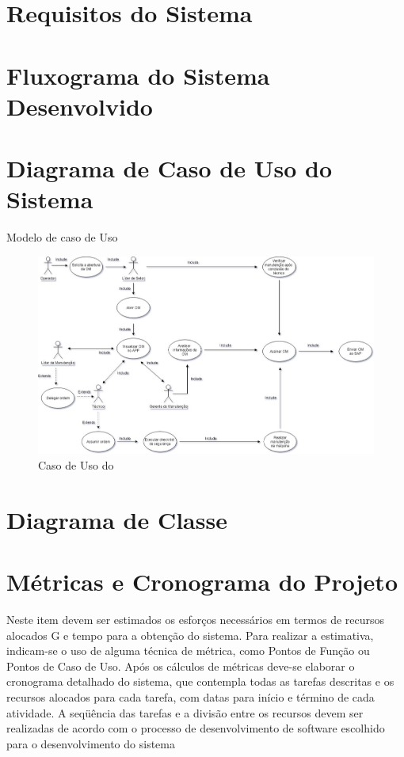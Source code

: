 \section{Requisitos do Sistema}



\section{Fluxograma do Sistema Desenvolvido}



\section{Diagrama de Caso de Uso do Sistema }

{\color{red}Modelo de caso de Uso }

\begin{figure}[htb]
	\caption{\label{caso_uso}Caso de Uso do }
	\begin{center}
		\includegraphics[scale=0.50]{./Figuras/caso-uso.png}
	\end{center}
\end{figure}


\section{Diagrama de Classe}

\section{Métricas e  Cronograma do Projeto}

Neste item devem ser estimados os esforços necessários em termos de recursos alocados G e tempo para a obtenção do sistema. Para realizar a estimativa, indicam-se o uso de alguma técnica de métrica, como Pontos de Função ou Pontos de Caso de Uso.
Após os cálculos de métricas deve-se elaborar o cronograma detalhado do sistema, que contempla todas as tarefas descritas e os recursos alocados para cada tarefa, com datas para início e término de cada atividade. A seqüência das tarefas e a divisão entre os recursos devem ser realizadas de acordo com o processo de desenvolvimento de software escolhido para o desenvolvimento do sistema